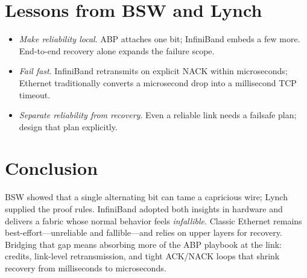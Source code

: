 \documentclass[../main.tex]{subfiles} %
\begin{document}
{{{{{{\section{Lessons from BSW and Lynch}

\begin{itemize}
\item \emph{Make reliability local}.  ABP attaches one bit; InfiniBand embeds
      a few more.  End-to-end recovery alone expands the failure scope.
\item \emph{Fail fast}.  InfiniBand retransmits on explicit NACK within
      microseconds; Ethernet traditionally converts a microsecond drop into a
      millisecond TCP timeout.
\item \emph{Separate reliability from recovery}.  Even a reliable link needs
      a failsafe plan; design that plan explicitly.
\end{itemize}

\section{Conclusion}

\begin{highlightbox}[CONCLUSION:]
\noindent
BSW showed that a single alternating bit can tame a capricious wire; Lynch
supplied the proof rules.  InfiniBand adopted both insights in hardware and
delivers a fabric whose normal behavior feels \emph{infallible}.  Classic
Ethernet remains best-effort---unreliable and fallible---and relies on upper
layers for recovery.  Bridging that gap means absorbing more of the ABP
playbook at the link: credits, link-level retransmission, and tight ACK/NACK
loops that shrink recovery from milliseconds to microseconds.
\end{highlightbox}
 

%
%
%
%

}}}}}}
\end{document}
